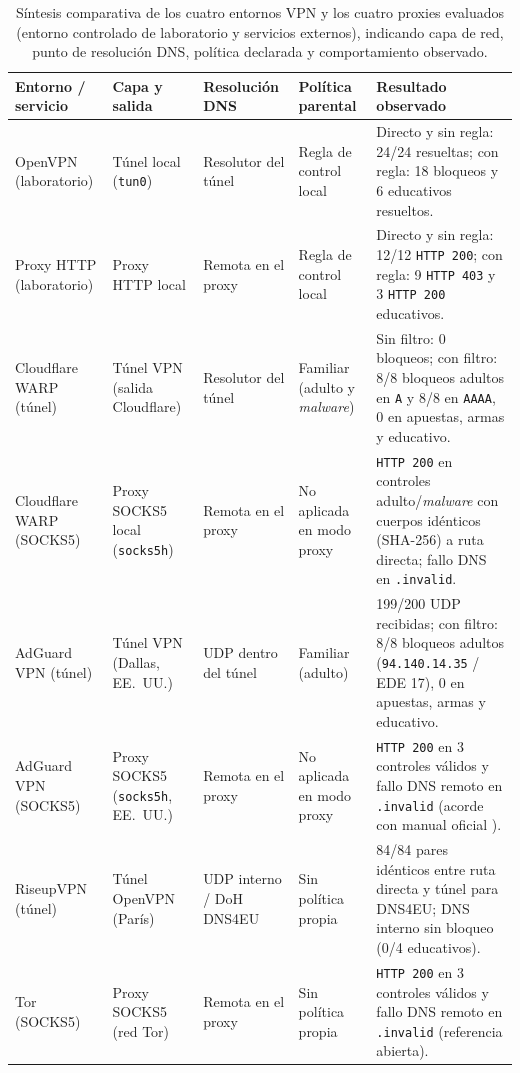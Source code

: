\documentclass[10pt,a4paper]{article}
\begin{document}
\begin{table}[H]
\centering\scriptsize
\caption{Síntesis comparativa de los cuatro entornos VPN y los cuatro proxies evaluados (entorno controlado de laboratorio y servicios externos), indicando capa de red, punto de resolución DNS, política declarada y comportamiento observado.}
\label{tab:vpn-proxies}
\begin{tabularx}{\textwidth}{>{\raggedright\arraybackslash}p{2.35cm}>{\raggedright\arraybackslash}p{2.35cm}>{\raggedright\arraybackslash}p{2.15cm}>{\raggedright\arraybackslash}p{2.25cm}Y}
\toprule
Entorno / servicio & Capa y salida & Resolución DNS & Política parental & Resultado observado\\
\midrule
OpenVPN (laboratorio) & Túnel local (\texttt{tun0}) & Resolutor del túnel & Regla de control local & Directo y sin regla: 24/24 resueltas; con regla: 18 bloqueos y 6 educativos resueltos.\\
Proxy HTTP (laboratorio) & Proxy HTTP local & Remota en el proxy & Regla de control local & Directo y sin regla: 12/12 \texttt{HTTP 200}; con regla: 9 \texttt{HTTP 403} y 3 \texttt{HTTP 200} educativos.\\
Cloudflare WARP (túnel) & Túnel VPN (salida Cloudflare) & Resolutor del túnel & Familiar (adulto y \emph{malware}) & Sin filtro: 0 bloqueos; con filtro: 8/8 bloqueos adultos en \texttt{A} y 8/8 en \texttt{AAAA}, 0 en apuestas, armas y educativo.\\
Cloudflare WARP (SOCKS5) & Proxy SOCKS5 local (\texttt{socks5h}) & Remota en el proxy & No aplicada en modo proxy & \texttt{HTTP 200} en controles adulto/\emph{malware} con cuerpos idénticos (SHA-256) a ruta directa; fallo DNS en \texttt{.invalid}.\\
AdGuard VPN (túnel) & Túnel VPN (Dallas, EE.~UU.) & UDP dentro del túnel & Familiar (adulto) & 199/200 UDP recibidas; con filtro: 8/8 bloqueos adultos (\texttt{94.140.14.35} / EDE 17), 0 en apuestas, armas y educativo.\\
AdGuard VPN (SOCKS5) & Proxy SOCKS5 (\texttt{socks5h}, EE.~UU.) & Remota en el proxy & No aplicada en modo proxy & \texttt{HTTP 200} en 3 controles válidos y fallo DNS remoto en \texttt{.invalid} (acorde con manual oficial \cite{adguardvpnlinux}).\\
RiseupVPN (túnel) & Túnel OpenVPN (París) & UDP interno / DoH DNS4EU & Sin política propia & 84/84 pares idénticos entre ruta directa y túnel para DNS4EU; DNS interno sin bloqueo (0/4 educativos).\\
Tor (SOCKS5) & Proxy SOCKS5 (red Tor) & Remota en el proxy & Sin política propia & \texttt{HTTP 200} en 3 controles válidos y fallo DNS remoto en \texttt{.invalid} (referencia abierta).\\
\bottomrule
\end{tabularx}
\end{table}
\end{document}
